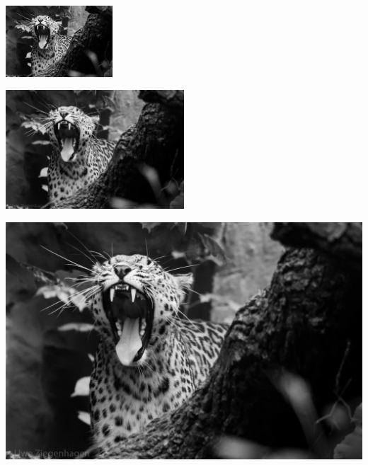 \documentclass[12pt,ngerman]{scrartcl}
\begin{document}
\begin{center}
\includegraphics[width=4cm]{hallowelt.jpg}
\end{center}


\begin{center}
\includegraphics[width=0.5\textwidth]{hallowelt.jpg}
\end{center}


\begin{center}
\includegraphics[width=\textwidth]{hallowelt.jpg}
\end{center}
\end{document}
